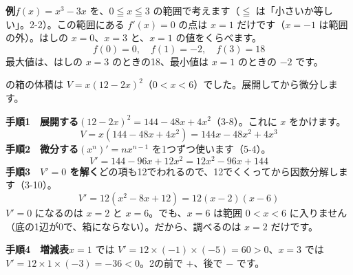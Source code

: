 \noindent\begin{minipage}[c]{0.52\linewidth}\raggedright
\textbf{例}\quad $f(x)=x^3-3x$ を、$0\leqq x\leqq3$ の範囲で考えます（$\leqq$ は「小さいか等しい」。2-2）。この範囲にある $f'(x)=0$ の点は $x=1$ だけです（$x=-1$ は範囲の外）。はしの $x=0$、$x=3$ と、$x=1$ の値をくらべます。
\[ f(0)=0,\quad f(1)=-2,\quad f(3)=18 \]
最大値は、はしの $x=3$ のときの18、最小値は $x=1$ のときの $-2$ です。
\end{minipage}\hfill
\begin{minipage}[c]{0.44\linewidth}\centering
{}
\end{minipage}


\label{bk:5-7:hako}\bkhatenaref の箱の体積は $V=x(12-2x)^2$（$0<x<6$）でした。展開してから微分します。

\noindent\textbf{手順1　展開する}\quad $(12-2x)^2=144-48x+4x^2$（3-8）。これに $x$ をかけます。
\[ V=x(144-48x+4x^2)=144x-48x^2+4x^3 \]
\textbf{手順2　微分する}\quad $(x^n)'=nx^{n-1}$ を1つずつ使います（5-4）。
\[ V'=144-96x+12x^2=12x^2-96x+144 \]
\textbf{手順3　$V'=0$ を解く}\quad どの項も12でわれるので、12でくくってから因数分解します（3-10）。
\[ V'=12(x^2-8x+12)=12(x-2)(x-6) \]
$V'=0$ になるのは $x=2$ と $x=6$。でも、$x=6$ は範囲 $0<x<6$ に入りません（底の1辺が0で、箱にならない）。だから、調べるのは $x=2$ だけです。

\noindent\textbf{手順4　増減表}\quad $x=1$ では $V'=12\times(-1)\times(-5)=60>0$、$x=3$ では $V'=12\times1\times(-3)=-36<0$。2の前で $+$、後で $-$ です。

